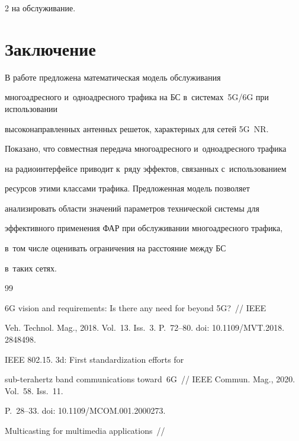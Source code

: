 \begin{multicols}{2}
на обслуживание.

  

\section{Заключение}



  В работе предложена математическая модель обслуживания 

  многоадресного и~одноадресного трафика на БС в~сис\-те\-мах~5G/6G при использовании 

вы\-со\-ко\-на\-прав\-лен\-ных антенных решеток, характерных для сетей 5G~NR. 

Показано, что со\-вмест\-ная передача многоадресного и~одноадресного трафика 

на радиоинтерфейсе приводит к~ряду эффектов, связанных с~использованием 

ресурсов этими классами трафика. Предложенная модель поз\-во\-ля\-ет 

анализировать области значений па\-ра\-мет\-ров технической сис\-те\-мы для 

эффективного применения ФАР при обслуживании многоадресного трафика, 

в~том чис\-ле оценивать ограничения на рас\-сто\-яние между БС

в~таких сетях.

  

{\small\frenchspacing

 {\baselineskip=11.5pt


 \begin{thebibliography}{99}


 6G vision and requirements: Is there any need for beyond 5G?~// IEEE 

Veh. Technol. Mag., 2018. Vol.~13. Iss.~3. P.~72--80. doi: 10.1109/MVT.2018. 2848498.


 IEEE 802.15. 3d: First standardization efforts for  

sub-terahertz band communications toward~6G~// IEEE Commun. Mag., 2020. Vol.~58. Iss.~11. 

P.~28--33. doi: 10.1109/MCOM.001.2000273. 


 Multicasting for multimedia applications~// 


\end{thebibliography}}}
\end{multicols}
